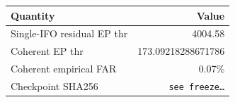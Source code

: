 \begin{tabular}{lr}
\hline
Quantity & Value \\
\hline
Single-IFO residual EP thr & 4004.58 \\
Coherent EP thr & 173.09218288671786 \\
Coherent empirical FAR & 0.07\% \\
Checkpoint SHA256 & \texttt{see freeze\ldots} \\
\hline
\end{tabular}
